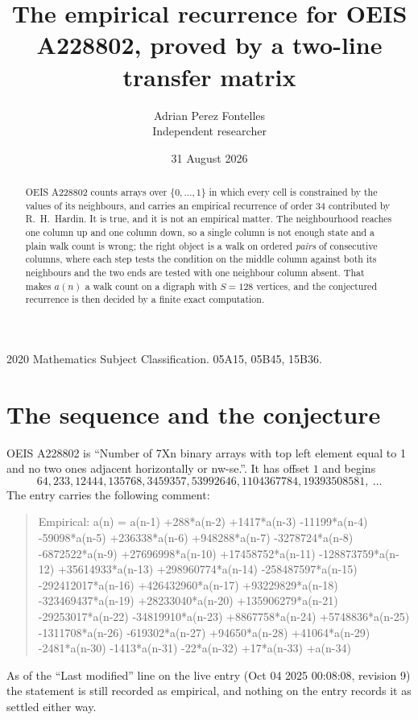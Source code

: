 \documentclass[11pt,a4paper]{article}
\title{The empirical recurrence for OEIS A228802, proved by a two-line transfer matrix}
\author{Adrian Perez Fontelles\\ \small Independent researcher}
\date{31 August 2026}
\theoremstyle{plain}
\theoremstyle{definition}
\begin{document}
\maketitle

\begin{abstract}
OEIS A228802 counts arrays over $\{0,\dots,1\}$ in which every cell is constrained by the
values of its neighbours, and carries an empirical recurrence of order $34$ contributed
by R.~H.~Hardin. It is true, and it is not an empirical matter. The neighbourhood reaches one
column up and one column down, so a single column is not enough state and a plain walk count
is wrong; the right object is a walk on ordered \emph{pairs} of consecutive columns, where
each step tests the condition on the middle column against both its neighbours and the two
ends are tested with one neighbour column absent. That makes $a(n)$ a walk count on a digraph
with $S=128$ vertices, and the conjectured recurrence is then decided by a finite exact
computation.
\end{abstract}

\noindent\small 2020 Mathematics Subject Classification. 05A15, 05B45, 15B36.\normalsize

\section{The sequence and the conjecture}

OEIS A228802 is ``Number of 7Xn binary arrays with top left element equal to 1 and no two ones adjacent horizontally or nw-se.''. It has offset $1$ and begins
\[
64, 233, 12444, 135768, 3459357, 53992646, 1104367784, 19393508581,\ \dots
\]
The entry carries the following comment:
\begin{quote}\small
Empirical: a(n) = a(n-1) +288*a(n-2) +1417*a(n-3) -11199*a(n-4) -59098*a(n-5) +236338*a(n-6) +948288*a(n-7) -3278724*a(n-8) -6872522*a(n-9) +27696998*a(n-10) +17458752*a(n-11) -128873759*a(n-12) +35614933*a(n-13) +298960774*a(n-14) -258487597*a(n-15) -292412017*a(n-16) +426432960*a(n-17) +93229829*a(n-18) -323469437*a(n-19) +28233040*a(n-20) +135906279*a(n-21) -29253017*a(n-22) -34819910*a(n-23) +8867758*a(n-24) +5748836*a(n-25) -1311708*a(n-26) -619302*a(n-27) +94650*a(n-28) +41064*a(n-29) -2481*a(n-30) -1413*a(n-31) -22*a(n-32) +17*a(n-33) +a(n-34)
\end{quote}
As of the ``Last modified'' line on the live entry (Oct 04 2025 00:08:08, revision 9) the statement is
still recorded as empirical, and nothing on the entry records it as settled either way.
\end{document}
